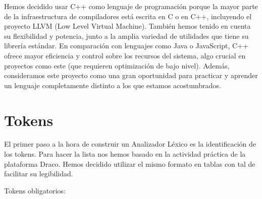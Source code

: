 \documentclass{article}
\begin{document}
\vspace{0.5cm}

Hemos decidido usar C++ como lenguaje de programación porque la mayor parte de la infraestructura de compiladores está escrita en C o en C++, incluyendo el proyecto LLVM (Low Level Virtual Machine). También hemos tenido en cuenta su flexibilidad y potencia, junto a la amplia variedad de utilidades que tiene su librería estándar. En comparación con lenguajes como Java o JavaScript, C++ ofrece mayor eficiencia y control sobre los recursos del sistema, algo crucial en proyectos como este (que requieren optimización de bajo nivel). Además, consideramos este proyecto como una gran oportunidad para practicar y aprender un lenguaje completamente distinto a los que estamos acostumbrados.

\newpage

\section{Tokens}
El primer paso a la hora de construir un Analizador Léxico es la identificación de los tokens. Para hacer la lista nos hemos basado en la actividad práctica de la plataforma Draco. Hemos decidido utilizar el mismo formato en tablas con tal de facilitar su legibilidad.

Tokens obligatorios:
\end{document}
